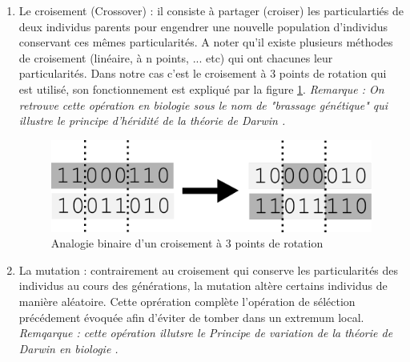 \documentclass[12pt]{report}
\begin{document}
        \begin{enumerate}
          \item Le croisement (Crossover) :
          il consiste à partager (croiser) les particulartiés de deux individus parents pour engendrer une nouvelle population d'individus conservant ces mêmes particularités. A noter qu'il existe plusieurs méthodes de croisement (linéaire, à n points, ... etc) qui ont chacunes leur particularités. Dans notre cas c'est le croisement à 3 points de rotation qui est utilisé, son fonctionnement est expliqué par la figure \ref{sch_crossover}.
          \emph{Remarque : On retrouve cette opération en biologie sous le nom de "brassage génétique" qui illustre le principe d'héridité de la théorie de Darwin \cite{darwin}.}
          \begin{figure}[h]
            \centering
            \includegraphics{img/crossover.png}
            \caption{Analogie binaire d'un croisement à 3 points de rotation}
            \label{sch_crossover}
          \end{figure}
          \item La mutation :
          contrairement au croisement qui conserve les particularités des individus au cours des générations, la mutation altère certains individus de manière aléatoire. Cette oprération complète l'opération de séléction précédement évoquée afin d'éviter de tomber dans un extremum local.
          \emph{Remqarque : cette opération illutsre le Principe de variation de la théorie de Darwin en biologie \cite{darwin}.}
        \end{enumerate}
\end{document}
